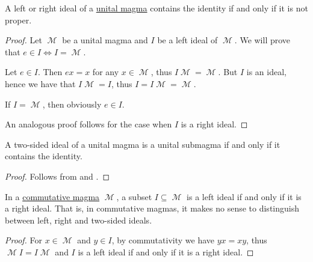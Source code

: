 \begin{proposition}\label{thm:proper_ideals_containing_identity}
  A left or right ideal of a \hyperref[def:unital_magma]{unital magma} contains the identity if and only if it is not proper.
\end{proposition}
\begin{proof}
  Let \( \mscrM \) be a unital magma and \( I \) be a left ideal of \( \mscrM \). We will prove that \( e \in I \iff I = \mscrM \).

  \Sufficiency Let \( e \in I \). Then \( ex = x \) for any \( x \in \mscrM \), thus \( I\mscrM = \mscrM \). But \( I \) is an ideal, hence we have that \( I\mscrM = I \), thus \( I = I\mscrM = \mscrM \).

  \Necessity If \( I = \mscrM \), then obviously \( e \in I \).

  An analogous proof follows for the case when \( I \) is a right ideal.
\end{proof}

\begin{corollary}\label{thm:unital_magma_ideal_is_submagma_iff_contains_identity}
  A two-sided ideal of a unital magma is a unital submagma if and only if it contains the identity.
\end{corollary}
\begin{proof}
  Follows from  and .
\end{proof}

\begin{proposition}\label{thm:commutative_magma_ideals}
  In a \hyperref[def:magma/commutative]{commutative magma} \( \mscrM \), a subset \( I \subseteq \mscrM \) is a left ideal if and only if it is a right ideal. That is, in commutative magmas, it makes no sense to distinguish between left, right and two-sided ideals.
\end{proposition}
\begin{proof}
  For \( x \in \mscrM \) and \( y \in I \), by commutativity we have \( yx = xy \), thus \( \mscrM I = I \mscrM \) and \( I \) is a left ideal if and only if it is a right ideal.
\end{proof}

